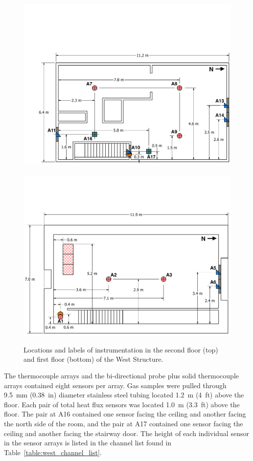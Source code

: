 \begin{figure}
	\centering
	\includegraphics[width=0.94\columnwidth]{Figures/Floor_Plans/West_Structure_2nd_Floor_Dimensioned_Instrumentation}
	\\~\\
	\includegraphics[width=\columnwidth]{Figures/Floor_Plans/West_Structure_1st_Floor_Dimensioned_Instrumentation}
	\caption[Locations and labels of instrumentation in the West Structure]{Locations and labels of instrumentation in the second floor (top) and first floor (bottom) of the West Structure.}
	\label{fig:west_instrumentation}
\end{figure}

The thermocouple arrays and the bi-directional probe plus solid thermocouple arrays contained eight sensors per array. Gas samples were pulled through 9.5~mm (0.38~in) diameter stainless steel tubing located 1.2~m (4~ft) above the floor. Each pair of total heat flux sensors was located 1.0~m (3.3~ft) above the floor. The pair at A16 contained one sensor facing the ceiling and another facing the north side of the room, and the pair at A17 contained one sensor facing the ceiling and another facing the stairway door. The height of each individual sensor in the sensor arrays is listed in the channel list found in Table~\ref{table:west_channel_list}.


